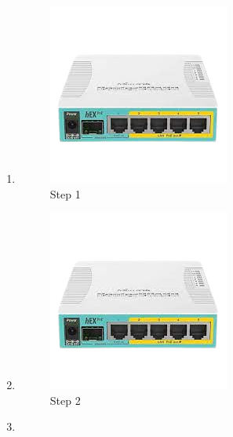 \begin{enumerate}
	\item 
	
	\begin{figure}[H]
		\centering
		\includegraphics[width=0.7\linewidth]{P1/img/contoh.png}
		\caption{Step 1}
		\label{fig:gambar1}
	\end{figure}

	\item 	
	
	\begin{figure}[H]
		\centering
		\includegraphics[width=0.7\linewidth]{P1/img/contoh.png}
		\caption{Step 2}
		\label{fig:gambar1}
	\end{figure}

	\item 
	

\end{enumerate}
